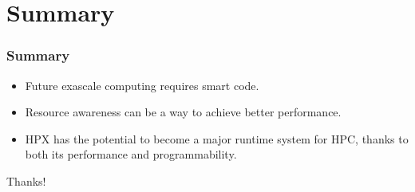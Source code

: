 \documentclass[compress]{beamer}
\begin{document}
\section{Summary}
\begin{frame}
	\frametitle{Summary}
	\begin{itemize}
		\item Future exascale computing requires smart code.
		\item Resource awareness can be a way to achieve better performance.
		\item HPX has the potential to become a major runtime system for HPC, thanks to both its performance and programmability.
	\end{itemize}
	\pause
	\vspace{5mm}
	\begin{center}
		\Huge Thanks! \normalsize
	\end{center}
\end{frame}


\end{document}
